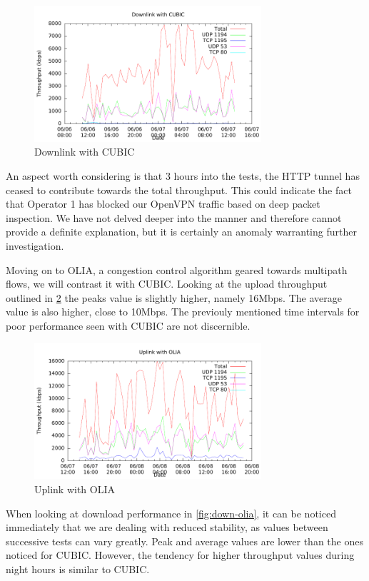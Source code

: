 \begin{figure}[H]
  \centering
  \includegraphics[width=0.75\textwidth]{img/down-cubic}
  \caption{Downlink with CUBIC}
  \label{fig:down-cubic}
\end{figure}

An aspect worth considering is that 3 hours into the tests, the HTTP tunnel
has ceased to contribute towards the total throughput. This could indicate the
fact that Operator 1 has blocked our OpenVPN traffic based on deep packet
inspection. We have not delved deeper into the manner and therefore cannot
provide a definite explanation, but it is certainly an anomaly warranting
further investigation.

Moving on to OLIA, a congestion control algorithm geared towards multipath
flows, we will contrast it with CUBIC. Looking at the upload throughput
outlined in \ref{fig:up-olia} the peaks value is slightly higher, namely
16Mbps. The average value is also higher, close to 10Mbps. The previouly
mentioned time intervals for poor performance seen with CUBIC are not
discernible.

\begin{figure}[H]
  \centering
  \includegraphics[width=0.75\textwidth]{img/up-olia}
  \caption{Uplink with OLIA}
  \label{fig:up-olia}
\end{figure}

When looking at download performance in \ref{fig:down-olia}, it can be noticed
immediately that we are dealing with reduced stability, as values between
successive tests can vary greatly. Peak and average values are lower than the
ones noticed for CUBIC. However, the tendency for higher throughput values
during night hours is similar to CUBIC.

